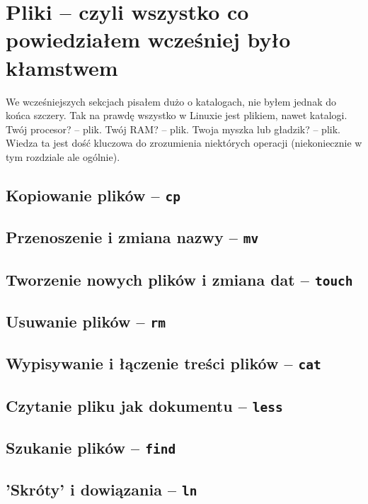\documentclass[12pt]{article}
\newcommand{\ttbf}[1]{
    \texttt{\textbf{#1}}
}
\begin{document}
\section{Pliki -- czyli wszystko co powiedziałem wcześniej było kłamstwem}
\label{sec:files}

We wcześniejszych sekcjach pisałem dużo o katalogach, nie byłem jednak do końca szczery. Tak na prawdę wszystko w Linuxie jest plikiem, nawet katalogi. Twój procesor? -- plik. Twój RAM? -- plik. Twoja myszka lub gładzik? -- plik. Wiedza ta jest dość kluczowa do zrozumienia niektórych operacji (niekoniecznie w tym rozdziale ale ogólnie).

\subsection{Kopiowanie plików -- \ttbf{cp}}

\subsection{Przenoszenie i zmiana nazwy -- \ttbf{mv}}

\subsection{Tworzenie nowych plików i zmiana dat -- \ttbf{touch}}

\subsection{Usuwanie plików -- \ttbf{rm}}

\subsection{Wypisywanie i łączenie treści plików -- \ttbf{cat}}

\subsection{Czytanie pliku jak dokumentu -- \ttbf{less}}

\subsection{Szukanie plików -- \ttbf{find}}

\subsection{'Skróty' i dowiązania -- \ttbf{ln}}
\end{document}
